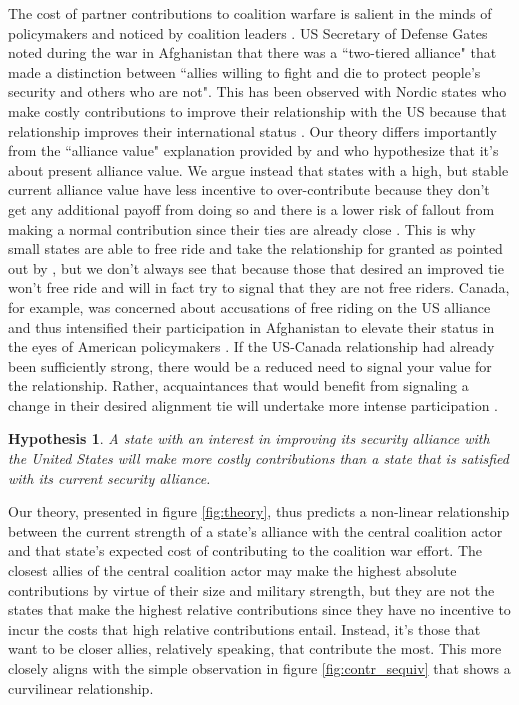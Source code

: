 \documentclass[12pt,letterpaper]{article}
\newtheorem{hyp}{Hypothesis}
\begin{document}
		The cost of partner contributions to coalition warfare is salient in the minds of policymakers and noticed by coalition leaders \citep[328]{ringsmose_natoburdensharingredux_2010}. US Secretary of Defense Gates noted during the war in Afghanistan that there was a ``two-tiered alliance" that made a distinction between ``allies willing to fight and die to protect people's security and others who are not". This has been observed with Nordic states who make costly contributions to improve their relationship with the US because that relationship improves their international status \citep{pedersen_bandwagonstatuschanging_2018}. Our theory differs importantly from the ``alliance value" explanation provided by \citet{davidson_americaallieswar_2011} and \citet{massie_democraticalliesfollowership_2016} who hypothesize that it's about present alliance value. We argue instead that states with a high, but stable current alliance value have less incentive to over-contribute because they don't get any additional payoff from doing so and there is a lower risk of fallout from making a normal contribution since their ties are already close \citep{davidson_headingexitsdemocratic_2014}. This is why small states are able to free ride and take the relationship for granted as pointed out by \citet{keohane_biginfluencesmall_1971}, but we don't always see that because those that desired an improved tie won't free ride and will in fact try to signal that they are not free riders. Canada, for example, was concerned about accusations of free riding on the US alliance and thus intensified their participation in Afghanistan to elevate their status in the eyes of American policymakers \citep{massie_alliancevaluestatus_2018}. If the US-Canada relationship had already been sufficiently strong, there would be a reduced need to signal your value for the relationship. Rather, acquaintances that would benefit from signaling a change in their desired alignment tie will undertake more intense participation \citep{gartzke_contractsfriendsalliances_2012, gibler_priorcommitmentscompatible_2004}.

		\begin{hyp}
			A state with an interest in improving its security alliance with the United States will make more costly contributions than a state that is satisfied with its current security alliance.
		\end{hyp}

		Our theory, presented in figure \ref{fig:theory}, thus predicts a non-linear relationship between the current strength of a state's alliance with the central coalition actor and that state's expected cost of contributing to the coalition war effort. The closest allies of the central coalition actor may make the highest absolute contributions by virtue of their size and military strength, but they are not the states that make the highest relative contributions since they have no incentive to incur the costs that high relative contributions entail. Instead, it's those that want to be closer allies, relatively speaking, that contribute the most. This more closely aligns with the simple observation in figure \ref{fig:contr_sequiv} that shows a curvilinear relationship.
\end{document}
